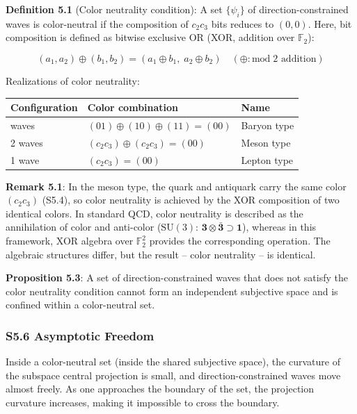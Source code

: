 \documentclass[
  a4paper,11pt]{article}
\newcounter{none}
\theoremstyle{definition}
\theoremstyle{remark}
\begin{document}
\textbf{Definition 5.1} (Color neutrality condition): A set
\(\{\psi_i\}\) of direction-constrained waves is color-neutral if the
composition of \(c_2 c_3\) bits reduces to \((0, 0)\). Here, bit
composition is defined as bitwise exclusive OR (XOR, addition over
\(\mathbb{F}_2\)):

\[(a_1, a_2) \oplus (b_1, b_2) = (a_1 \oplus b_1,\; a_2 \oplus b_2) \quad (\oplus: \text{mod}\; 2 \text{ addition})\]

Realizations of color neutrality:

{\def\LTcaptype{none} %
\begin{longtable}[]{@{}lll@{}}
\toprule\noalign{}
Configuration & Color combination & Name \\
\midrule\noalign{}
\endhead
\bottomrule\noalign{}
\endlastfoot
3 waves & \((01) \oplus (10) \oplus (11) = (00)\) & Baryon type \\
2 waves & \((c_2 c_3) \oplus (c_2 c_3) = (00)\) & Meson type \\
1 wave & \((c_2 c_3) = (00)\) & Lepton type \\
\end{longtable}
}

\textbf{Remark 5.1}: In the meson type, the quark and antiquark carry
the same color \((c_2 c_3)\) (S5.4), so color neutrality is achieved by
the XOR composition of two identical colors. In standard QCD, color
neutrality is described as the annihilation of color and anti-color
(\(\mathrm{SU}(3)\):
\(\mathbf{3} \otimes \bar{\mathbf{3}} \supset \mathbf{1}\)), whereas in
this framework, XOR algebra over \(\mathbb{F}_2^2\) provides the
corresponding operation. The algebraic structures differ, but the result
-- color neutrality -- is identical.

\textbf{Proposition 5.3}: A set of direction-constrained waves that does
not satisfy the color neutrality condition cannot form an independent
subjective space and is confined within a color-neutral set.

\subsubsection{S5.6 Asymptotic Freedom}\label{s5.6-asymptotic-freedom}

Inside a color-neutral set (inside the shared subjective space), the
curvature of the subspace central projection is small, and
direction-constrained waves move almost freely. As one approaches the
boundary of the set, the projection curvature increases, making it
impossible to cross the boundary.
\end{document}
